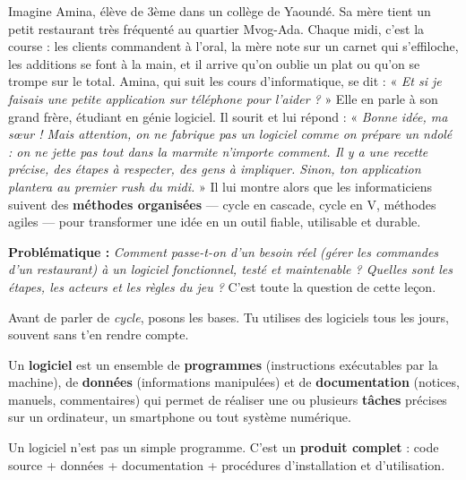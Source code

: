 \documentclass[11pt]{article}
\newcounter{popsec}
\newcounter{popsub}
\newcommand{\courssub}[1]{%
  \stepcounter{popsub}%
  \par\vspace{9pt}\noindent{\popxbold\fontsize{11.5}{13}\selectfont\color{popink}{\color{poporange}\thepopsec.\thepopsub}\hspace{6pt}#1}\par\nopagebreak\vspace{4pt}
}
\begin{document}
Imagine Amina, élève de 3ème dans un collège de Yaoundé. Sa mère tient un petit restaurant très fréquenté au quartier Mvog-Ada. Chaque midi, c'est la course : les clients commandent à l'oral, la mère note sur un carnet qui s'effiloche, les additions se font à la main, et il arrive qu'on oublie un plat ou qu'on se trompe sur le total. Amina, qui suit les cours d'informatique, se dit : « \emph{Et si je faisais une petite application sur téléphone pour l'aider ?} » Elle en parle à son grand frère, étudiant en génie logiciel. Il sourit et lui répond : « \emph{Bonne idée, ma sœur ! Mais attention, on ne fabrique pas un logiciel comme on prépare un ndolé : on ne jette pas tout dans la marmite n'importe comment. Il y a une recette précise, des étapes à respecter, des gens à impliquer. Sinon, ton application plantera au premier rush du midi.} » Il lui montre alors que les informaticiens suivent des \textbf{méthodes organisées} — cycle en cascade, cycle en V, méthodes agiles — pour transformer une idée en un outil fiable, utilisable et durable.

\medskip\noindent
\textbf{Problématique :} \emph{Comment passe-t-on d'un besoin réel (gérer les commandes d'un restaurant) à un logiciel fonctionnel, testé et maintenable ? Quelles sont les étapes, les acteurs et les règles du jeu ?} C'est toute la question de cette leçon.

\courssub{Qu'est-ce qu'un logiciel ?}

Avant de parler de \emph{cycle}, posons les bases. Tu utilises des logiciels tous les jours, souvent sans t'en rendre compte.

\begin{definition}[Logiciel]
Un \textbf{logiciel} est un ensemble de \textbf{programmes} (instructions exécutables par la machine), de \textbf{données} (informations manipulées) et de \textbf{documentation} (notices, manuels, commentaires) qui permet de réaliser une ou plusieurs \textbf{tâches} précises sur un ordinateur, un smartphone ou tout système numérique.
\end{definition}

\begin{aretenir}
Un logiciel n'est pas un simple programme. C'est un \textbf{produit complet} : code source + données + documentation + procédures d'installation et d'utilisation.
\end{aretenir}
\end{document}
